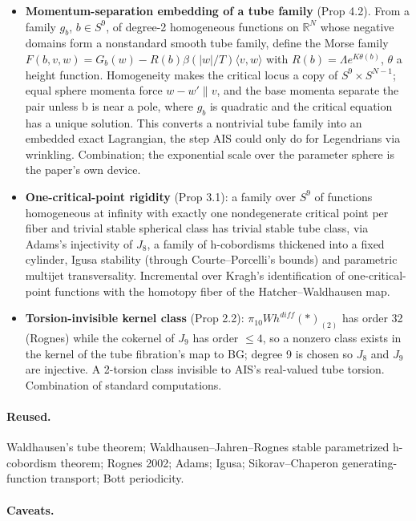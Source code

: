 \documentclass[11pt]{article}
\begin{document}
\begin{itemize}
\item \textbf{Momentum-separation embedding of a tube family} (Prop 4.2). From a family $g_b$, $b \in S^{9}$, of degree-2 homogeneous functions on $\mathbb R^N$ whose negative domains form a nonstandard smooth tube family, define the Morse family $F(b,v,w)=G_b(w)-R(b)\beta(|w|/T)\langle v,w\rangle$ with $R(b)=\Lambda e^{K\theta(b)}$, $\theta$ a height function. Homogeneity makes the critical locus a copy of $S^9\times S^{N-1}$; equal sphere momenta force $w-w'\parallel v$, and the base momenta separate the pair unless b is near a pole, where $g_b$ is quadratic and the critical equation has a unique solution. This converts a nontrivial tube family into an embedded exact Lagrangian, the step AIS could only do for Legendrians via wrinkling. Combination; the exponential scale over the parameter sphere is the paper's own device.
\item \textbf{One-critical-point rigidity} (Prop 3.1): a family over $S^{9}$ of functions homogeneous at infinity with exactly one nondegenerate critical point per fiber and trivial stable spherical class has trivial stable tube class, via Adams's injectivity of $J_{8}$, a family of h-cobordisms thickened into a fixed cylinder, Igusa stability (through Courte--Porcelli's bounds) and parametric multijet transversality. Incremental over Kragh's identification of one-critical-point functions with the homotopy fiber of the Hatcher--Waldhausen map.
\item \textbf{Torsion-invisible kernel class} (Prop 2.2): $\pi_{10}Wh^{diff}(*)_{(2)}$ has order 32 (Rognes) while the cokernel of $J_{9}$ has order $\le 4$, so a nonzero class exists in the kernel of the tube fibration's map to BG; degree 9 is chosen so $J_{8}$ and $J_{9}$ are injective. A 2-torsion class invisible to AIS's real-valued tube torsion. Combination of standard computations.
\end{itemize}

\paragraph{Reused.}

Waldhausen's tube theorem; Waldhausen--Jahren--Rognes stable parametrized h-cobordism theorem; Rognes 2002; Adams; Igusa; Sikorav--Chaperon generating-function transport; Bott periodicity.

\paragraph{Caveats.}
\end{document}
